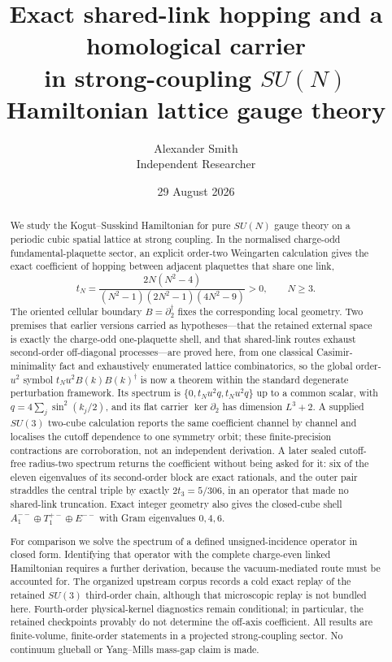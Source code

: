 \documentclass[11pt]{article}
\theoremstyle{plain}
\theoremstyle{definition}
\theoremstyle{remark}
\newcommand{\dg}{^{\dagger}}
\begin{document}
\title{\bfseries Exact shared-link hopping and a homological carrier\\
in strong-coupling $SU(N)$ Hamiltonian lattice gauge theory}
\author{Alexander Smith\\ \small Independent Researcher}
\date{29 August 2026}
\maketitle

\begin{abstract}
\noindent
We study the Kogut--Susskind Hamiltonian for pure $SU(N)$ gauge theory on a
periodic cubic spatial lattice at strong coupling. In the normalised
charge-odd fundamental-plaquette sector, an explicit order-two Weingarten
calculation gives the exact coefficient of hopping between adjacent
plaquettes that share one link,
\[
  t_N=\frac{2N(N^2-4)}{(N^2-1)(2N^2-1)(4N^2-9)}>0,\qquad N\ge 3 .
\]
The oriented cellular boundary $B=\partial_2\dg$ fixes the corresponding local
geometry. Two premises that earlier versions carried as hypotheses---that the
retained external space is exactly the charge-odd one-plaquette shell, and
that shared-link routes exhaust second-order off-diagonal processes---are
proved here, from one classical Casimir-minimality fact and exhaustively
enumerated lattice combinatorics, so the global order-$u^2$ symbol
$t_Nu^2B(k)B(k)\dg$ is now a theorem within the standard degenerate
perturbation framework. Its spectrum is
$\{0,t_Nu^2q,t_Nu^2q\}$ up to a common scalar, with
$q=4\sum_j\sin^2(k_j/2)$, and its flat carrier
$\ker\partial_2$ has dimension $L^3+2$. A supplied $SU(3)$ two-cube
calculation reports the same coefficient channel by channel and localises the
cutoff dependence to one symmetry orbit; these finite-precision contractions
are corroboration, not an independent derivation. A later sealed cutoff-free
radius-two spectrum returns the coefficient without being asked for it: six of
the eleven eigenvalues of its second-order block are exact rationals, and the
outer pair straddles the central triple by exactly $2t_3=5/306$, in an
operator that made no shared-link truncation. Exact integer geometry also
gives the closed-cube shell
$A_1^{--}\oplus T_1^{+-}\oplus E^{--}$ with Gram eigenvalues $0,4,6$.

For comparison we solve the spectrum of a defined unsigned-incidence operator
in closed form. Identifying that operator with the complete charge-even linked
Hamiltonian requires a further derivation, because the vacuum-mediated route
must be accounted for. The organized upstream corpus records a cold exact
replay of the retained $SU(3)$ third-order chain, although that microscopic
replay is not bundled here. Fourth-order physical-kernel diagnostics remain
conditional; in particular, the retained checkpoints provably do not determine
the off-axis coefficient.
All results are finite-volume, finite-order statements in a projected
strong-coupling sector. No continuum glueball or Yang--Mills mass-gap claim is
made.
\end{abstract}
\end{document}
